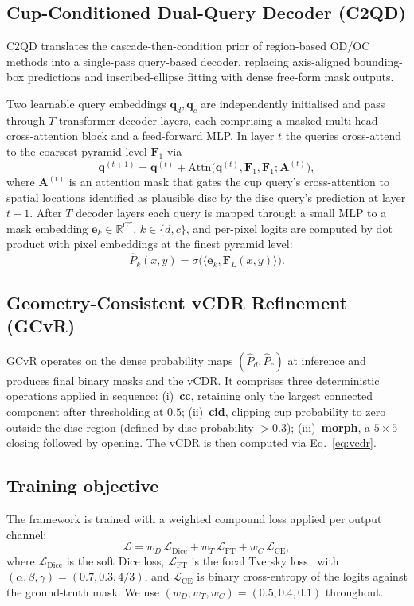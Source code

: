 \documentclass[runningheads]{llncs}
\begin{document}
\subsection{Cup-Conditioned Dual-Query Decoder (C2QD)}
C2QD translates the cascade-then-condition prior of region-based OD/OC methods into a single-pass query-based decoder, replacing axis-aligned bounding-box predictions and inscribed-ellipse fitting with dense free-form mask outputs.

Two learnable query embeddings $\mathbf{q}_d, \mathbf{q}_c$ are independently initialised and pass through $T$ transformer decoder layers, each comprising a masked multi-head cross-attention block and a feed-forward MLP. In layer $t$ the queries cross-attend to the coarsest pyramid level $\mathbf{F}_1$ via
\begin{equation}
\mathbf{q}^{(t+1)} = \mathbf{q}^{(t)} + \text{Attn}\big(\mathbf{q}^{(t)}, \mathbf{F}_1, \mathbf{F}_1; \mathbf{A}^{(t)}\big),
\end{equation}
where $\mathbf{A}^{(t)}$ is an attention mask that gates the cup query's cross-attention to spatial locations identified as plausible disc by the disc query's prediction at layer $t\!-\!1$. After $T$ decoder layers each query is mapped through a small MLP to a mask embedding $\mathbf{e}_k \in \mathbb{R}^{C''}$, $k \in \{d,c\}$, and per-pixel logits are computed by dot product with pixel embeddings at the finest pyramid level:
\begin{equation}
\hat{P}_k(x,y) = \sigma\big(\langle \mathbf{e}_k, \mathbf{F}_L(x,y) \rangle\big).
\end{equation}

\subsection{Geometry-Consistent vCDR Refinement (GCvR)}
GCvR operates on the dense probability maps $(\hat{P}_d, \hat{P}_c)$ at inference and produces final binary masks and the vCDR. It comprises three deterministic operations applied in sequence: (i)~\textbf{cc}, retaining only the largest connected component after thresholding at $0.5$; (ii)~\textbf{cid}, clipping cup probability to zero outside the disc region (defined by disc probability $> 0.3$); (iii)~\textbf{morph}, a $5\!\times\!5$ closing followed by opening. The vCDR is then computed via Eq.~\eqref{eq:vcdr}.

\subsection{Training objective}
The framework is trained with a weighted compound loss applied per output channel:
\begin{equation}
\mathcal{L} = w_D\,\mathcal{L}_\text{Dice} + w_T\,\mathcal{L}_\text{FT} + w_C\,\mathcal{L}_\text{CE},
\end{equation}
where $\mathcal{L}_\text{Dice}$ is the soft Dice loss, $\mathcal{L}_\text{FT}$ is the focal Tversky loss~\cite{c2ftfnet2023} with $(\alpha,\beta,\gamma)=(0.7,0.3,4/3)$, and $\mathcal{L}_\text{CE}$ is binary cross-entropy of the logits against the ground-truth mask. We use $(w_D, w_T, w_C) = (0.5, 0.4, 0.1)$ throughout.
\end{document}

